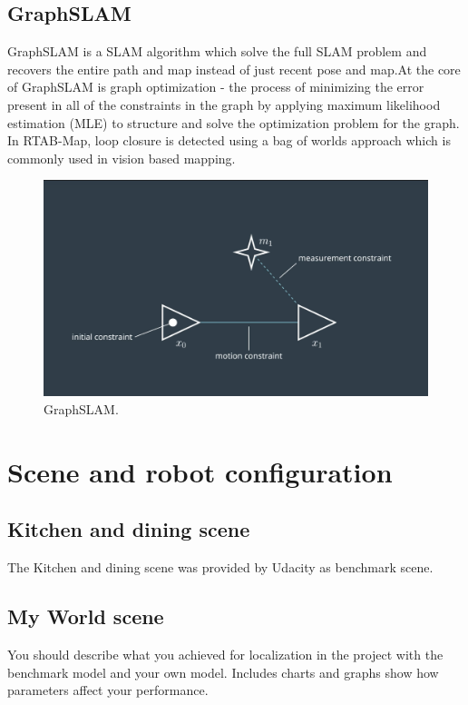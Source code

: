 \documentclass[10pt,journal,compsoc]{IEEEtran}
\begin{document}
\subsection{GraphSLAM}
GraphSLAM is a SLAM algorithm which solve the full SLAM problem and recovers the entire path and map instead of just recent pose and map.At the core of GraphSLAM is graph optimization - the process of minimizing the error present in all of the constraints in the graph by applying maximum likelihood estimation (MLE) to structure and solve the optimization problem for the graph.
In RTAB-Map, loop closure is detected using a bag of worlds approach which is commonly used in vision based mapping.
\begin{figure}[thpb]
      \centering
      \includegraphics[width=\linewidth]{GraphSLAM.png}
      \caption{GraphSLAM.}
      \label{fig:robot1}
\end{figure}

\section{Scene and robot configuration}

\subsection{Kitchen and dining scene}
The Kitchen and dining scene was provided by Udacity as benchmark scene.
\subsection{My World scene}
You should describe what you achieved for localization in the project with the benchmark model and your own model. Includes charts and graphs show how parameters affect your performance. 
\end{document}
